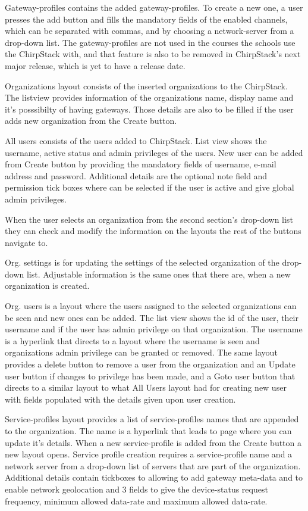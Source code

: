 Gateway-profiles contains the added gateway-profiles.
To create a new one, a user presses the add button and fills the mandatory fields of the enabled channels, which can be separated with commas, and by choosing a network-server from a drop-down list.
The gateway-profiles are not used in the courses the schools use the ChirpStack with, and that feature is also to be removed in ChirpStack's next major release, which is yet to have a release date.

Organizations layout consists of the inserted organizations to the ChirpStack.
The listview provides information of the organizations name, display name and it's posssibilty of having gateways.
Those details are also to be filled if the user adds new organization from the Create button.

All users consists of the users added to ChirpStack.
List view shows the username, active status and admin privileges of the users.
New user can be added from Create button by providing the mandatory fields of username, e-mail address and password. Additional details are the optional note field and permission tick boxes where can be selected if the user is active and give global admin privileges.

When the user selects an organization from the second section's drop-down list they can check and modify the information on the layouts the rest of the buttons navigate to.

Org. settings is for updating the settings of the selected organization of the drop-down list.
Adjustable information is the same ones that there are, when a new organization is created.

Org. users is a layout where the users assigned to the selected organizations can be seen and new ones can be added.
The list view shows the id of the user, their username and if the user has admin privilege on that organization.
The username is a hyperlink that directs to a layout where the username is seen and organizations admin privilege can be granted or removed.
The same layout provides a delete button to remove a user from the organization and an Update user button if changes to privilege has been made, and a Goto user button that directs to a similar layout to what All Users layout had for creating new user with fields populated with the details given upon user creation.

Service-profiles layout provides a list of service-profiles names that are appended to the organization.
The name is a hyperlink that leads to page where you can update it's details.
When a new service-profile is added from the Create button a new layout opens.
Service profile creation requires a service-profile name and a network server from a drop-down list of servers that are part of the organization.
Additional details contain tickboxes to allowing to add gateway meta-data and to enable network geolocation and 3 fields to give the device-status request frequency, minimum allowed data-rate and maximum allowed data-rate.


